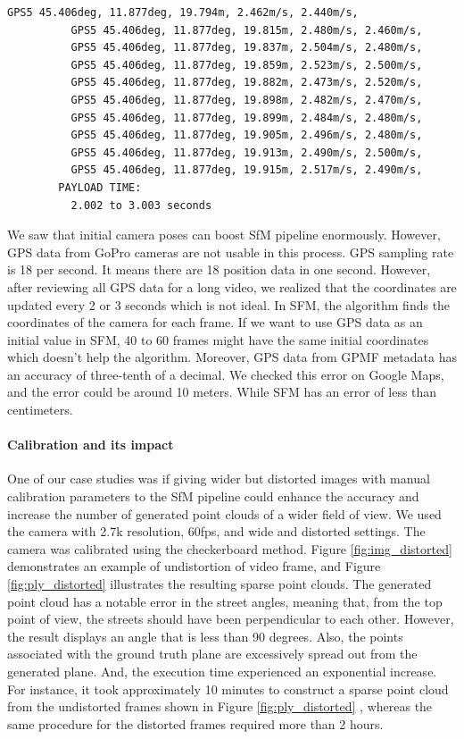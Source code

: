 \documentclass[11pt]{article}
\begin{document}
\begin{lstlisting}[language=bash,caption={gpmf-parser output},label={lst:lstlisting}]
          GPS5 45.406deg, 11.877deg, 19.794m, 2.462m/s, 2.440m/s,
          GPS5 45.406deg, 11.877deg, 19.815m, 2.480m/s, 2.460m/s,
          GPS5 45.406deg, 11.877deg, 19.837m, 2.504m/s, 2.480m/s,
          GPS5 45.406deg, 11.877deg, 19.859m, 2.523m/s, 2.500m/s,
          GPS5 45.406deg, 11.877deg, 19.882m, 2.473m/s, 2.520m/s,
          GPS5 45.406deg, 11.877deg, 19.898m, 2.482m/s, 2.470m/s,
          GPS5 45.406deg, 11.877deg, 19.899m, 2.484m/s, 2.480m/s,
          GPS5 45.406deg, 11.877deg, 19.905m, 2.496m/s, 2.480m/s,
          GPS5 45.406deg, 11.877deg, 19.913m, 2.490m/s, 2.500m/s,
          GPS5 45.406deg, 11.877deg, 19.915m, 2.517m/s, 2.490m/s,
        PAYLOAD TIME:
          2.002 to 3.003 seconds
    \end{lstlisting}

    We saw that initial camera poses can boost SfM pipeline enormously. However, GPS data from GoPro cameras
    are not usable in this process.
    GPS sampling rate is 18 per second. It means there are 18 position data in one second. However, after reviewing
    all GPS data for a long video, we realized that the coordinates are updated every 2 or 3 seconds which is not ideal.
    In SFM, the algorithm finds the coordinates of the camera for each frame. If we want to use GPS data as an initial
    value in SFM, 40 to 60 frames might have the same initial coordinates which doesn't help the algorithm.
    Moreover, GPS data from GPMF metadata has an accuracy of three-tenth of a decimal. We checked this error on
    Google Maps, and the error could be around 10 meters. While SFM has an error of less than centimeters.

    \paragraph{Calibration and its impact}
    \label{calib_impact}
    One of our case studies was if giving wider but distorted images with manual calibration parameters to the SfM pipeline
    could enhance the accuracy and increase the number of generated point clouds of a wider field of view. We used
    the camera with 2.7k resolution, 60fps, and wide and distorted settings. The camera was calibrated using the
    checkerboard method. Figure \ref{fig:img_distorted} demonstrates an example of undistortion of video frame,
    and Figure \ref{fig:ply_distorted} illustrates the resulting sparse point clouds.
    The generated point cloud has a notable error in the street angles, meaning that, from the top point of view, the
    streets should have been perpendicular to each other. However, the result displays an angle that is less than 90 degrees.
    Also, the points associated with the ground truth plane are excessively spread out from the generated plane.
    And, the execution time experienced an exponential increase. For instance, it took approximately
    10 minutes to construct a sparse point cloud from the undistorted frames shown in Figure \ref{fig:ply_distorted}
    , whereas the same procedure for the distorted frames required more than 2 hours.
\end{document}
